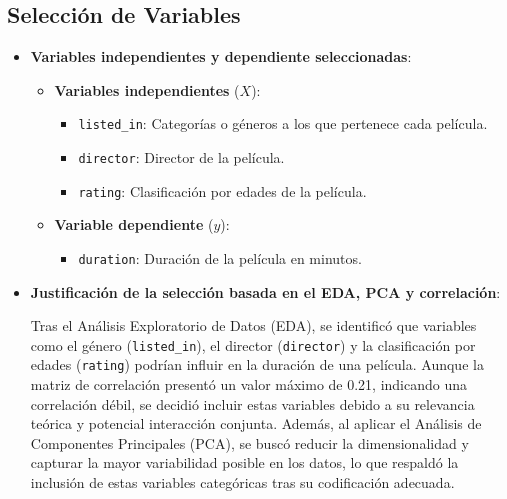 \documentclass{article}
\begin{document}
\subsection{Selección de Variables}
\begin{itemize}
    \item \textbf{Variables independientes y dependiente seleccionadas}:
    \begin{itemize}
        \item \textbf{Variables independientes} (\( X \)):
        \begin{itemize}
            \item \texttt{listed\_in}: Categorías o géneros a los que pertenece cada película.
            \item \texttt{director}: Director de la película.
            \item \texttt{rating}: Clasificación por edades de la película.
        \end{itemize}
        \item \textbf{Variable dependiente} (\( y \)):
        \begin{itemize}
            \item \texttt{duration}: Duración de la película en minutos.
        \end{itemize}
    \end{itemize}

    \item \textbf{Justificación de la selección basada en el EDA, PCA y correlación}:

    Tras el Análisis Exploratorio de Datos (EDA), se identificó que variables como el género (\texttt{listed\_in}), el director (\texttt{director}) y la clasificación por edades (\texttt{rating}) podrían influir en la duración de una película. Aunque la matriz de correlación presentó un valor máximo de 0.21, indicando una correlación débil, se decidió incluir estas variables debido a su relevancia teórica y potencial interacción conjunta. Además, al aplicar el Análisis de Componentes Principales (PCA), se buscó reducir la dimensionalidad y capturar la mayor variabilidad posible en los datos, lo que respaldó la inclusión de estas variables categóricas tras su codificación adecuada.

\end{itemize}
\end{document}
